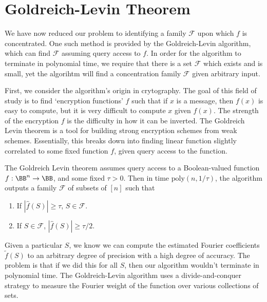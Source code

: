 \section{Goldreich-Levin Theorem}

We have now reduced our problem to identifying a family $\mathcal{F}$ upon which $f$ is concentrated. One such method is provided by the Goldreich-Levin algorithm, which can find $\mathcal{F}$ assuming query access to $f$. In order for the algorithm to terminate in polynomial time, we require that there is a set $\mathcal{F}$ which exists and is small, yet the algorihtm will find a concentration family $\mathcal{F}$ given arbitrary input.

First, we consider the algorithm's origin in crytography. The goal of this field of study is to find `encryption functions' $f$ such that if $x$ is a message, then $f(x)$ is easy to compute, but it is very difficult to compute $x$ given $f(x)$. The strength of the encryption $f$ is the difficulty in how it can be inverted. The Goldreich Levin theorem is a tool for building strong encryption schemes from weak schemes. Essentially, this breaks down into finding linear function slightly correlated to some fixed function $f$, given query access to the function.

The Goldreich Levin theorem assumes query access to a Boolean-valued function $f: \BB^n \to \BB$, and some fixed $\tau > 0$. Then in time $\text{poly}(n,1/\tau)$, the algorithm outputs a family $\mathcal{F}$ of subsets of $[n]$ such that
%
\begin{enumerate}
        \item If $|\widehat{f}(S)| \geq \tau$, $S \in \mathcal{F}$.
        \item If $S \in \mathcal{F}$, $|\widehat{f}(S)| \geq \tau/2$.
\end{enumerate}
%
Given a particular $S$, we know we can compute the estimated Fourier coefficients $\tilde{f}(S)$ to an arbitrary degree of precision with a high degree of accuracy. The problem is that if we did this for all $S$, then our algorithm wouldn't terminate in polynomial time. The Goldreich-Levin algorithm uses a divide-and-conquer strategy to measure the Fourier weight of the function over various collections of sets.

